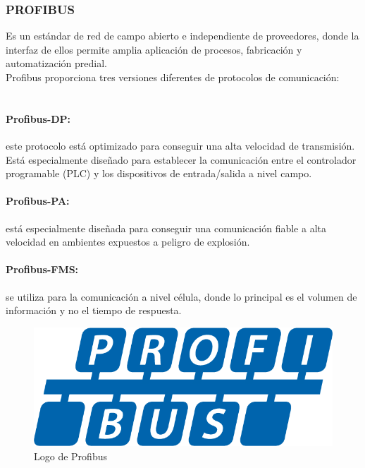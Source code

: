 \documentclass[12pt,titlepage]{article}
\begin{document}
\subsubsection{PROFIBUS}
Es un estándar de red de campo abierto e independiente de proveedores, donde la interfaz de ellos permite amplia aplicación de procesos, fabricación y automatización predial. \\[0.8mm] 
Profibus proporciona tres versiones diferentes de protocolos de comunicación: \\ \\

\paragraph*{Profibus-DP:} este protocolo está optimizado para conseguir una alta velocidad de transmisión. Está especialmente diseñado para establecer la comunicación entre el controlador programable (PLC) y los dispositivos de entrada/salida a nivel campo.  
\paragraph*{Profibus-PA:} está especialmente diseñada para conseguir una comunicación fiable a alta velocidad en ambientes expuestos a peligro de explosión.  
\paragraph*{Profibus-FMS:} se utiliza para la comunicación a nivel célula, donde lo principal es el volumen de información y no el tiempo de respuesta.\\

\begin{figure}[htbp]
\hspace*{6.0cm} 
\includegraphics[scale=0.25]{profibus}
\caption{Logo de Profibus}
\end{figure}
\newpage
\end{document}
